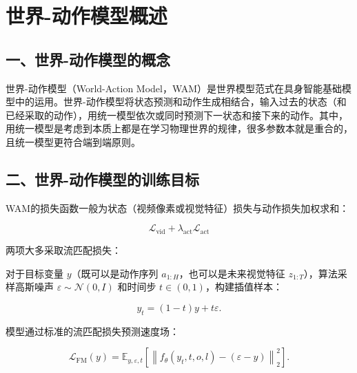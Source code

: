 \setcounter{section}{0}

\hypertarget{ux4e16ux754c-ux52a8ux4f5cux6a21ux578bux6982ux8ff0}{%
\section{世界-动作模型概述}\label{ux4e16ux754c-ux52a8ux4f5cux6a21ux578bux6982ux8ff0}}

\hypertarget{ux4e00ux4e16ux754c-ux52a8ux4f5cux6a21ux578bux7684ux6982ux5ff5}{%
\subsection{一、世界-动作模型的概念}\label{ux4e00ux4e16ux754c-ux52a8ux4f5cux6a21ux578bux7684ux6982ux5ff5}}

世界-动作模型（World-Action Model，WAM）是世界模型范式在具身智能基础模型中的运用。世界-动作模型将状态预测和动作生成相结合，输入过去的状态（和已经采取的动作），用统一模型依次或同时预测下一状态和接下来的动作。其中，用统一模型是考虑到本质上都是在学习物理世界的规律，很多参数本就是重合的，且统一模型更符合端到端原则。

\hypertarget{ux4e8cux4e16ux754c-ux52a8ux4f5cux6a21ux578bux7684ux8badux7ec3ux76eeux6807}{%
\subsection{二、世界-动作模型的训练目标}\label{ux4e8cux4e16ux754c-ux52a8ux4f5cux6a21ux578bux7684ux8badux7ec3ux76eeux6807}}

WAM的损失函数一般为状态（视频像素或视觉特征）损失与动作损失加权求和：

\[
\mathcal{L}_{\mathrm{vid}}+\lambda_{\mathrm{act}}\mathcal{L}_{\mathrm{act}}
\]

两项大多采取流匹配损失：

对于目标变量 \(y\)（既可以是动作序列 \(a_{1:H}\)，也可以是未来视觉特征 \(z_{1:T}\)），算法采样高斯噪声 \(\varepsilon\sim\mathcal{N}(0,I)\) 和时间步 \(t\in(0,1)\)，构建插值样本：

\[
y_t=(1-t)y+t\varepsilon.
\]

模型通过标准的流匹配损失预测速度场：

\[
\mathcal{L}_{\mathrm{FM}}(y)=\mathbb{E}_{y,\varepsilon,t}\left[\left\|f_\theta(y_t,t,o,l)-(\varepsilon-y)\right\|_2^2\right].
\]

